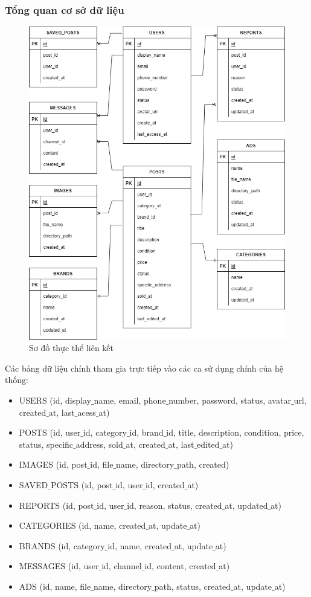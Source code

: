 \documentclass[../DoAn.tex]{subfiles}
\begin{document}
\subsubsection{Tổng quan cơ sở dữ liệu}
\begin{figure}[H]
    \centering
    \includegraphics[width=0.95\linewidth]{Hinhve/entity.png}
    \caption{Sơ đồ thực thể liên kết}
    \label{fig:Fig1}
\end{figure}
\newpage
Các bảng dữ liệu chính tham gia trực tiếp vào các ca sử dụng chính của hệ thống: 
\begin{itemize}
    \item USERS (id, display$\_$name, email, phone$\_$number, password, status, avatar$\_$url, created$\_$at, last$\_$acess$\_$at)
    \item POSTS (id, user$\_$id, category$\_$id, brand$\_$id, title, description, condition, price, status, specific$\_$address, sold$\_$at, created$\_$at, last$\_$edited$\_$at) 
    \item IMAGES (id, post$\_$id, file$\_$name, directory$\_$path, created)
    \item SAVED$\_$POSTS (id, post$\_$id, user$\_$id, created$\_$at)
    \item REPORTS (id, post$\_$id, user$\_$id, reason, status, created$\_$at, updated$\_$at)  
    \item CATEGORIES (id, name, created$\_$at, update$\_$at) 
    \item BRANDS (id, category$\_$id, name, created$\_$at, update$\_$at)
    \item MESSAGES (id, user$\_$id, channel$\_$id, content, created$\_$at)
    \item ADS (id, name, file$\_$name, directory$\_$path, status, created$\_$at, update$\_$at)
\end{itemize}
\end{document}
